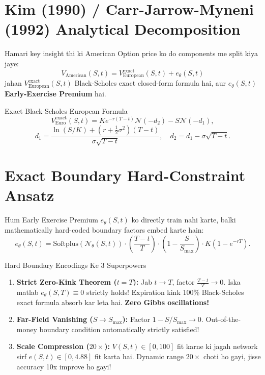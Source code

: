\documentclass[11pt,a4paper,oneside]{book}
\begin{document}
\section{Kim (1990) / Carr-Jarrow-Myneni (1992) Analytical Decomposition}
Hamari key insight thi ki American Option price ko do components me split kiya jaye:
\begin{equation}
    \boxed{V_{\text{American}}(S, t) = V_{\text{European}}^{\text{exact}}(S, t) + e_\theta(S, t)}
\end{equation}
jahan $V_{\text{European}}^{\text{exact}}(S, t)$ Black-Scholes exact closed-form formula hai, aur $e_\theta(S, t)$ \textbf{Early-Exercise Premium} hai.

\begin{mathbox}{Exact Black-Scholes European Formula}
\begin{equation}
    V_{\text{Euro}}^{\text{exact}}(S, t) = K e^{-r(T-t)} \mathcal{N}(-d_2) - S \mathcal{N}(-d_1),
\end{equation}
\begin{equation}
    d_1 = \frac{\ln(S/K) + \left(r + \frac{1}{2}\sigma^2\right)(T-t)}{\sigma \sqrt{T-t}}, \quad d_2 = d_1 - \sigma \sqrt{T-t}.
\end{equation}
\end{mathbox}

\section{Exact Boundary Hard-Constraint Ansatz}
Hum Early Exercise Premium $e_\theta(S, t)$ ko directly train nahi karte, balki mathematically hard-coded boundary factors embed karte hain:
\begin{equation}
    \boxed{e_\theta(S, t) = \text{Softplus}\left(\mathcal{N}_\theta(S, t)\right) \cdot \left(\frac{T-t}{T}\right) \cdot \left(1 - \frac{S}{S_{\max}}\right) \cdot K\left(1 - e^{-rT}\right).}
\end{equation}

\begin{intuitionbox}{Hard Boundary Encodings Ke 3 Superpowers}
\begin{enumerate}
    \item \textbf{Strict Zero-Kink Theorem ($t=T$):} Jab $t \to T$, factor $\frac{T-t}{T} \to 0$. Iska matlab $e_\theta(S, T) \equiv 0$ strictly holds! Expiration kink 100\% Black-Scholes exact formula absorb kar leta hai. \textbf{Zero Gibbs oscillations!}
    \item \textbf{Far-Field Vanishing ($S \to S_{\max}$):} Factor $1 - S/S_{\max} \to 0$. Out-of-the-money boundary condition automatically strictly satisfied!
    \item \textbf{Scale Compression ($20\times$):} $V(S, t) \in [0, 100]$ fit karne ki jagah network sirf $e(S, t) \in [0, 4.88]$ fit karta hai. Dynamic range $20\times$ choti ho gayi, jisse accuracy 10x improve ho gayi!
\end{enumerate}
\end{intuitionbox}
\end{document}
